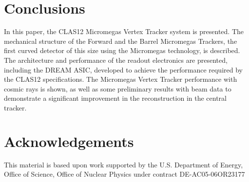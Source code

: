 \section{Conclusions}

In this paper, the CLAS12 Micromegas Vertex Tracker system is presented. The mechanical structure of the
Forward and the Barrel Micromegas Trackers, the first curved detector of this size using the Micromegas technology,
is described. The architecture and performance of the readout electronics are presented, including the DREAM ASIC,
developed to achieve the performance required by the CLAS12 specifications. The Micromegas Vertex Tracker
performance with cosmic rays is shown, as well as some preliminary results with beam data to demonstrate a significant
improvement in the reconstruction in the central tracker.

\section{Acknowledgements}


This material is based upon work supported by the U.S. Department of Energy, Office of Science, Office of Nuclear 
Physics under contract DE-AC05-06OR23177

